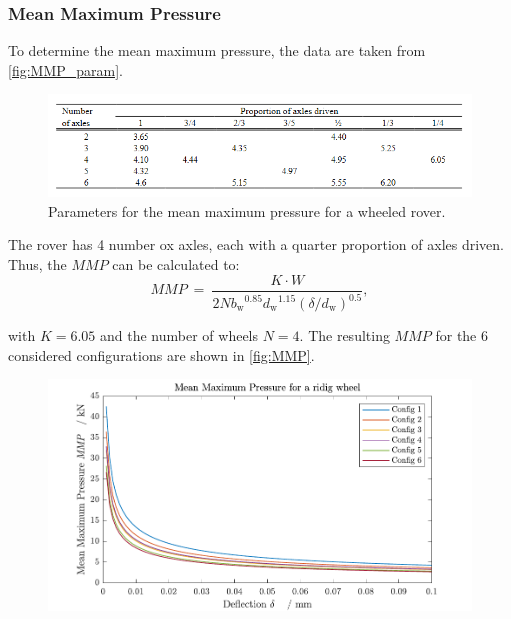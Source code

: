 \subsubsection*{Mean Maximum Pressure}
\label{app:MMP}

To determine the mean maximum pressure, the data are taken from \autoref{fig:MMP_param}. 

\begin{figure}[htb] 
  \centering
     \includegraphics[width=1\textwidth]{Media/MMP_Param.png}
  \caption{Parameters for the mean maximum pressure for a wheeled rover.}
  \label{fig:MMP_param}
\end{figure}

The rover has 4 number ox axles, each with a quarter proportion of axles driven. Thus, the \(MMP\) can be calculated to:
\begin{equation}
	MMP \:  = \: \frac{K \cdot W}{2N{b_\text{w}}^{0.85}{d_\text{w}}^{1.15} { \left( \delta / d_\text{w} \right) }^{0.5}}		,
	\label{eq:MMP}
\end{equation}

with \(K = 6.05\) and the number of wheels \(N=4\). The resulting \(MMP\) for the 6 considered configurations are shown in \autoref{fig:MMP}. 

\begin{figure}[htb] 
  \centering
     \includegraphics[width=1\textwidth]{Media/MMP for each Config.pdf}
  \caption{}
  \label{fig:MMP}
\end{figure}



